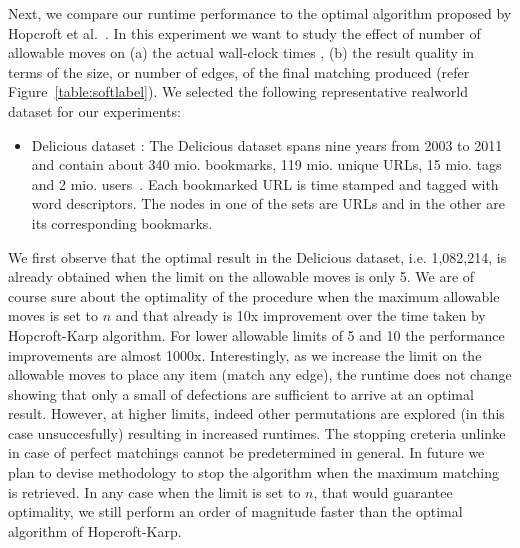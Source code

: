 Next, we compare our runtime performance to the optimal algorithm proposed by Hopcroft et al.~\cite{hopcroft1973n}. In this experiment we want to study the effect of number of allowable moves on (a) the actual wall-clock times , (b) the result quality in terms of the size, or number of edges, of the final matching produced (refer Figure~\ref{table:softlabel}). We selected the following representative realworld dataset for our experiments:

\begin{itemize}
  \item \textsf{Delicious dataset :} The \textsf{Delicious} dataset spans nine years from 2003 to 2011 and contain about 340 mio. bookmarks, 119 mio. unique URLs, 15 mio. tags and 2 mio. users~\cite{zubiaga2013harnessing}. Each bookmarked URL is time stamped and tagged with word descriptors. The nodes in one of the sets are URLs and in the other are its corresponding bookmarks.

\end{itemize}

We first observe that the optimal result in the \textsf{Delicious} dataset, i.e. 1,082,214, is already obtained when the limit on the allowable moves is only 5. We are of course sure about the optimality of the procedure when the maximum allowable moves is set to $n$ and that already is 10x improvement over the time taken by Hopcroft-Karp algorithm. For lower allowable limits of 5 and 10 the performance improvements are almost 1000x. Interestingly, as we increase the limit on the allowable moves to place any item (match any edge), the runtime does not change showing that only a small of defections are sufficient to arrive at an optimal result. However, at higher limits, indeed other permutations are explored (in this case unsuccesfully) resulting in increased runtimes. The stopping creteria unlinke in case of perfect matchings cannot be predetermined in general. In future we plan to devise methodology to stop the algorithm when the maximum matching is retrieved. In any case when the limit is set to $n$, that would guarantee optimality, we still perform an order of magnitude faster than the optimal algorithm of Hopcroft-Karp. 

